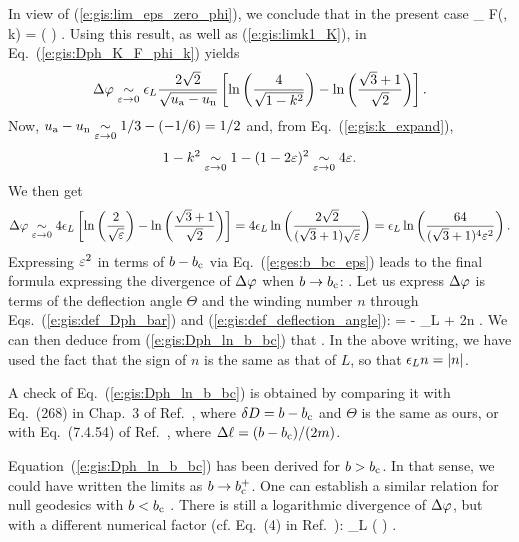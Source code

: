 In view of (\ref{e:gis:lim_eps_zero_phi}), we conclude that in the present
case
\be
    \lim_{\veps{}} F(\psi, k) = \ln \left( \right) .
\ee
Using this result, as well as (\ref{e:gis:limk1_K}), in Eq.~(\ref{e:gis:Dph_K_F_phi_k})
yields
\[
    \Delta\varphi \underset{\varepsilon\to 0}{\sim} \epsilon_L
    \frac{2 \sqrt{2}}{\sqrt{u_{\rm a} - u_{\rm n}}} \left[
    \ln \left( \frac{4}{\sqrt{1 - k^2}} \right)
    - \ln \left(\frac{\sqrt{3} + 1}{\sqrt{2}} \right)  \right] .
\]
Now, $u_{\rm a} - u_{\rm n} \underset{\varepsilon\to 0}{\sim} 1/3 - (-1/6) = 1/2$
and, from Eq.~(\ref{e:gis:k_expand}),
\[
    1 - k^2 \underset{\varepsilon\to 0}{\sim} 1 - (1 - 2\varepsilon)^2
            \underset{\varepsilon\to 0}{\sim}  4 \varepsilon .
\]
We then get
\[
    \Delta\varphi \underset{\varepsilon\to 0}{\sim}  4 \epsilon_L
    \left[
    \ln \left( \frac{2}{\sqrt{\varepsilon}} \right)
    - \ln \left(\frac{\sqrt{3} + 1}{\sqrt{2}} \right)  \right] =
    4 \epsilon_L \ln \left( \frac{2\sqrt{2}}{(\sqrt{3}+1)\sqrt{\varepsilon}} \right)
    = \epsilon_L \ln \left( \frac{64}{(\sqrt{3} + 1)^4 \varepsilon^2} \right) .
\]
Expressing $\varepsilon^2$ in terms of $b - b_{\rm c}$ via Eq.~(\ref{e:ges:b_bc_eps})
leads to the final formula expressing the divergence of $\Delta\varphi$
when $b\to b_{\rm c}$:
\be \label{e:gis:Dph_ln_b_bc}
    .
\ee
Let us express $\Delta\varphi$ is terms of the deflection angle $\Theta$ and
the winding number $n$ through Eqs.~(\ref{e:gis:def_Dph_bar}) and
(\ref{e:gis:def_deflection_angle}):
\be
    \Delta\ph = \Theta - \eps_L \pi + 2\pi n .
\ee
We can then deduce from (\ref{e:gis:Dph_ln_b_bc}) that
\be \label{e:ges:b_bc_exp_Theta}
   .
\ee
In the above writing, we have used the fact that the sign of $n$ is the same
as that of $L$, so that $\epsilon_L n = |n|$.
\begin{remark}
A check of Eq.~(\ref{e:gis:Dph_ln_b_bc}) is obtained by comparing it with
Eq.~(268) in Chap.~3 of Ref.~\cite{Chand83}, where $\delta D = b-b_{\rm c}$ and
$\Theta$ is the same as ours, or with Eq.~(7.4.54) of Ref.~\cite{FroloZ11},
where $\Delta\ell = (b - b_{\rm c})/(2 m)$.
\end{remark}
\begin{remark}
Equation~(\ref{e:gis:Dph_ln_b_bc}) has been derived for $b > b_{\rm c}$. In that sense,
we could have written the limits as $b\to b_{\rm c}^+$. One can establish
a similar relation for null geodesics with $b< b_{\rm c}$ \cite{GrallHW19}.
There is still a logarithmic divergence of $\Delta\varphi$, but with a different
numerical factor (cf. Eq.~(4) in Ref.~\cite{GrallHW19}):
\be
    \Delta\ph {}
    \eps_L \ln\left(  \right) .
\ee
\end{remark}

